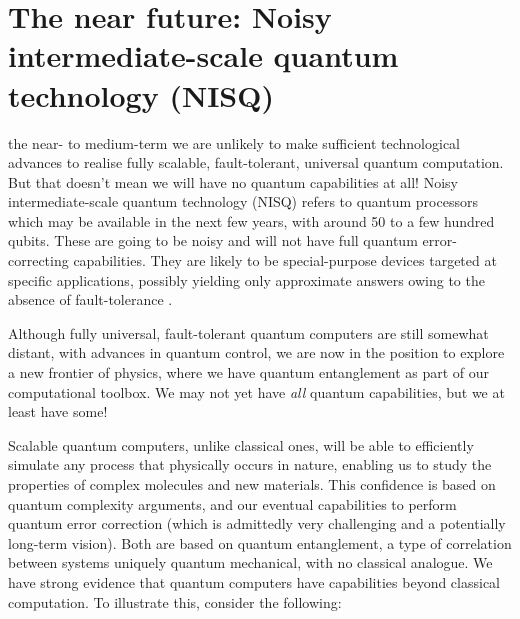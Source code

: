 \section{The near future: Noisy intermediate-scale quantum technology (NISQ)}\label{sec:NISQ}

 the near- to medium-term we are unlikely to make sufficient technological advances to realise fully scalable, fault-tolerant, universal quantum computation. But that doesn't mean we will have no quantum capabilities at all! Noisy intermediate-scale quantum technology (NISQ) refers to quantum processors which may be available in the next few years, with around 50 to a few hundred qubits. These are going to be noisy and will not have full quantum error-correcting capabilities. They are likely to be special-purpose devices targeted at specific applications, possibly yielding only approximate answers owing to the absence of fault-tolerance \cite{bib:preskill2018quantum}.

Although fully universal, fault-tolerant quantum computers are still somewhat distant, with advances in quantum control, we are now in the position to explore a new frontier of physics, where we have quantum entanglement as part of our computational toolbox. We may not yet have \textit{all} quantum capabilities, but we at least have some!

Scalable quantum computers, unlike classical ones, will be able to efficiently simulate any process that physically occurs in nature, enabling us to study the properties of complex molecules and new materials. This confidence is based on quantum complexity arguments, and our eventual capabilities to perform quantum error correction (which is admittedly very challenging and a potentially long-term vision). Both are based on quantum entanglement, a type of correlation between systems uniquely quantum mechanical, with no classical analogue. We have strong evidence that quantum computers have capabilities beyond classical computation. To illustrate this, consider the following:


